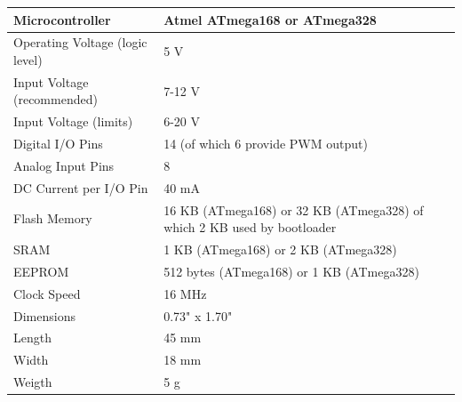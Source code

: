 \documentclass[14pt,a4paper]{extarticle}
\begin{document}
	\begin{tabular}{| p{5cm} | p{12cm} |}

	\hline
	Microcontroller & Atmel ATmega168 or ATmega328 \\ \hline
	Operating Voltage (logic level) & 5 V \\ \hline
	Input Voltage (recommended) &	7-12 V \\ \hline
	Input Voltage (limits)	& 6-20 V \\ \hline
Digital I/O Pins &	14 (of which 6 provide PWM output)\\ \hline
Analog Input Pins &	8 \\ \hline
DC Current per I/O Pin & 40 mA \\ \hline
Flash Memory &	16 KB (ATmega168) or 32 KB (ATmega328) of which 2 KB used by bootloader \\ \hline
SRAM &	1 KB (ATmega168) or 2 KB (ATmega328)\\ \hline
EEPROM	& 512 bytes (ATmega168) or 1 KB (ATmega328)\\ \hline
Clock Speed &	16 MHz \\ \hline
Dimensions &	0.73" x 1.70" \\ \hline
Length &	45 mm\\ \hline
Width &	18 mm\\ \hline
Weigth	& 5 g\\ \hline
	
	\end{tabular}
	
\end{document}
